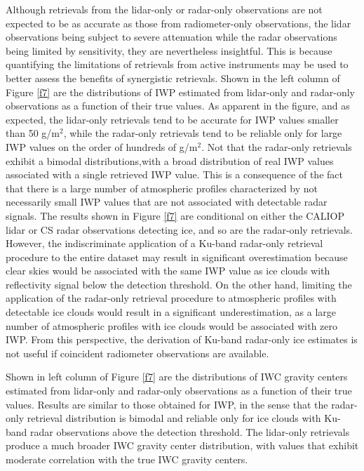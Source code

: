 \documentclass{ametsocV6.1}
\begin{document}
Although retrievals from the lidar-only or radar-only observations are not expected to be as accurate as those from radiometer-only observations, the lidar observations being subject to severe attenuation while the radar observations being limited by sensitivity, they are nevertheless insightful. This is because quantifying the limitations of retrievals from active instruments may be used to better assess  the benefits of synergistic retrievals.  Shown in the left column of Figure \ref{f7} are the distributions of IWP estimated from lidar-only and radar-only observations as a function of their true values. As apparent in the figure, and as expected, the lidar-only retrievals tend to be accurate for IWP values smaller than 50 g/m$^2$, while the radar-only retrievals tend to be reliable only for large IWP values on the order of hundreds of g/m$^2$.  Not that the radar-only retrievals exhibit a bimodal distributions,with a broad distribution of real IWP values associated with a single retrieved IWP value.  This is a consequence of the fact that there is a large number of atmospheric profiles characterized by not necessarily small IWP values that are not associated with detectable radar signals. The results shown in Figure \ref{f7} are conditional on either the CALIOP lidar or CS radar observations detecting ice, and so are the radar-only retrievals. However, the  indiscriminate application of a Ku-band radar-only retrieval procedure to the entire dataset may result in significant overestimation because clear skies would be associated with the same IWP value as ice clouds with reflectivity signal  below the detection threshold. On the other hand, limiting the application of the radar-only retrieval procedure to atmospheric profiles with detectable ice clouds would result in a significant underestimation, as a large number of atmospheric profiles with ice clouds would be associated with zero IWP.  From this perspective, the derivation of  Ku-band radar-only ice estimates is not useful if coincident radiometer observations are available.

Shown in left column of Figure \ref{f7} are the distributions of IWC gravity centers estimated from lidar-only and radar-only observations as a function of their true values. Results are similar to those obtained for IWP, in the sense that the radar-only retrieval distribution is bimodal and reliable only for ice clouds with Ku-band radar observations above the detection threshold. The lidar-only retrievals produce a much broader IWC gravity center distribution, with values that exhibit moderate  correlation with the true IWC gravity centers.  
\end{document}
